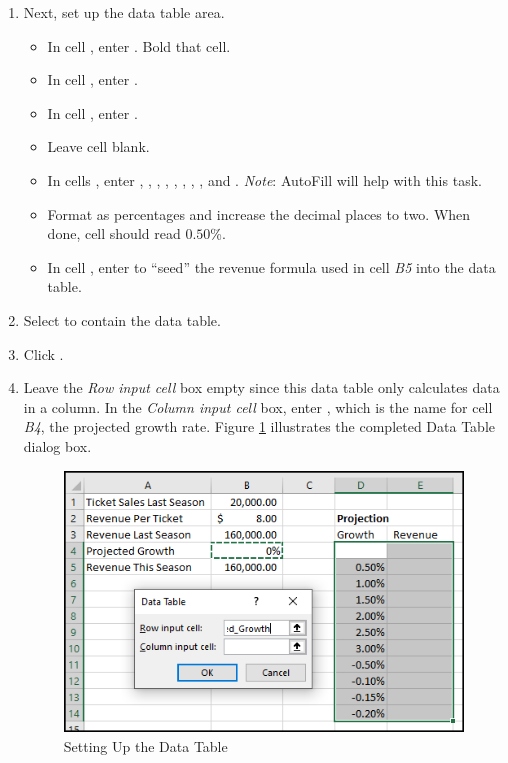\begin{enumbox}
\begin{enumerate}
		\item Next, set up the data table area.
	\begin{itemize}
		\item In cell , enter . Bold that cell.
		\item In cell , enter .
		\item In cell , enter .
		\item Leave cell  blank.
		\item In cells , enter , , , , , , , ,  and . \textit{Note}: AutoFill will help with this task.
		\item Format  as percentages and increase the decimal places to two. When done, cell  should read $ 0.50 $\%.
		\item In cell , enter  to ``seed'' the revenue formula used in cell \textit{B5} into the data table.
	\end{itemize}
	
		\item Select  to contain the data table.
		\item Click .
		\item Leave the \textit{Row input cell} box empty since this data table only calculates data in a column. In the \textit{Column input cell} box, enter , which is the name for cell \textit{B4}, the projected growth rate. Figure \ref{08:fig41} illustrates the completed Data Table dialog box.
		
		\begin{figure}[H]
			\centering
			\includegraphics[width=\maxwidth{.95\linewidth}]{gfx/ch08_fig41}
			\caption{Setting Up the Data Table}
			\label{08:fig41}
		\end{figure}


\end{enumerate}
\end{enumbox}

